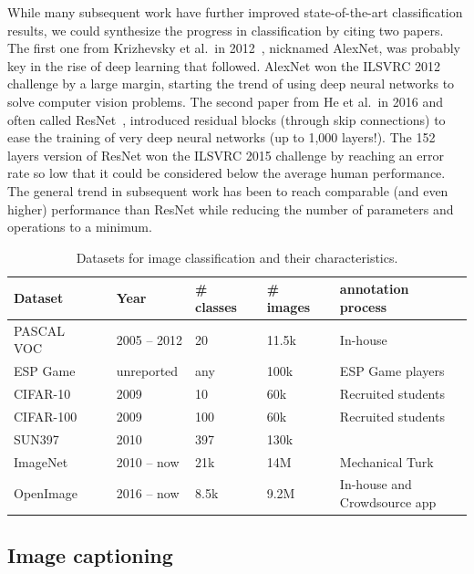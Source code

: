 While many subsequent work have further improved state-of-the-art classification results,
we could synthesize the progress in classification by citing two papers.
The first one from Krizhevsky et al.\ in 2012~\cite{krizhevsky2012imagenet},
nicknamed AlexNet, was probably key in the rise of deep learning that followed.
AlexNet won the ILSVRC 2012 challenge by a large margin,
starting the trend of using deep neural networks to solve computer vision problems.
The second paper from He et al.\ in 2016 and often called ResNet~\cite{he2016deep},
introduced residual blocks (through skip connections)
to ease the training of very deep neural networks (up to 1,000 layers!).
The 152 layers version of ResNet won the ILSVRC 2015 challenge
by reaching an error rate so low that
it could be considered below the average human performance.
The general trend in subsequent work has been to reach comparable
(and even higher) performance than ResNet while
reducing the number of parameters and operations to a minimum.

\begin{table}
\centering
\caption{Datasets for image classification and their characteristics.}
\begin{tabular}{lllll}
	Dataset & Year & \# classes & \# images &  annotation process \\
	\midrule
	PASCAL VOC~\cite{Everingham10} & 2005 -- 2012 & 20 & 11.5k &  In-house \\
	ESP Game~\cite{von2005esp} & unreported & any & 100k &  ESP Game players \\
	CIFAR-10~\cite{krizhevsky2009learning} & 2009 & 10 & 60k  & Recruited students \\
	CIFAR-100~\cite{krizhevsky2009learning} & 2009 & 100 & 60k  & Recruited students \\
	SUN397~\cite{xiao2010sun} & 2010 & 397 & 130k &   \\
	ImageNet~\cite{ILSVRC15} & 2010 -- now & 21k & 14M &  Mechanical Turk \\
	OpenImage~\cite{OpenImages, OpenImages2} & 2016 -- now & 8.5k & 9.2M & \makecell[l]{In-house and\\Crowdsource app} \\
\end{tabular}%
\label{tab:classification_ds}
\end{table}

\subsection{Image captioning}

